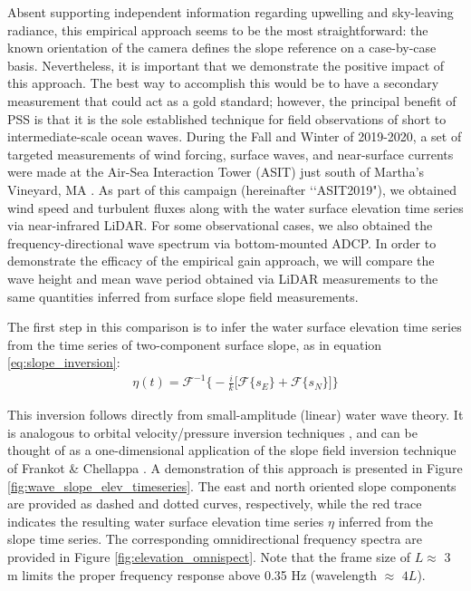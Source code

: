 \documentclass[letterpaper,journal]{IEEEtran}
\begin{document}
Absent supporting independent information regarding upwelling and sky-leaving radiance, this empirical approach seems to be the most straightforward: the known orientation of the camera defines the slope reference on a case-by-case basis. Nevertheless, it is important that we demonstrate the positive impact of this approach. The best way to accomplish this would be to have a secondary measurement that could act as a gold standard; however, the principal benefit of PSS is that it is the sole established technique for field observations of short to intermediate-scale ocean waves. During the Fall and Winter of 2019-2020, a set of targeted measurements of wind forcing, surface waves, and near-surface currents were made at the Air-Sea Interaction Tower (ASIT) just south of Martha's Vineyard, MA \cite{laxague_effects_2025}. As part of this campaign (hereinafter \lq\lq ASIT2019"), we obtained wind speed and turbulent fluxes along with the water surface elevation time series via near-infrared LiDAR. For some observational cases, we also obtained the frequency-directional wave spectrum via bottom-mounted ADCP. In order to demonstrate the efficacy of the empirical gain approach, we will compare the wave height and mean wave period obtained via LiDAR measurements to the same quantities inferred from surface slope field measurements.

The first step in this comparison is to infer the water surface elevation time series from the time series of two-component surface slope, as in equation \ref{eq:slope_inversion}:
\begin{align}
    \label{eq:slope_inversion}
    \eta(t)=\mathcal{F}^{-1}\Big\{-\frac{i}{k}\Big[\mathcal{F}\{s_E\}+\mathcal{F}\{s_N\}\Big]\Big\}
\end{align}

\newpage

This inversion follows directly from small-amplitude (linear) water wave theory. It is analogous to orbital velocity/pressure inversion techniques \cite{guza_local_1980}, and can be thought of as a one-dimensional application of the slope field inversion technique of Frankot \& Chellappa \cite{Frankot1988}. A demonstration of this approach is presented in Figure \ref{fig:wave_slope_elev_timeseries}. The east and north oriented slope components are provided as dashed and dotted curves, respectively, while the red trace indicates the resulting water surface elevation time series $\eta$ inferred from the slope time series. The corresponding omnidirectional frequency spectra are provided in Figure \ref{fig:elevation_omnispect}. Note that the frame size of $L\approx$ 3 m limits the proper frequency response above 0.35 Hz (wavelength $\approx$ $4L$).
\end{document}
